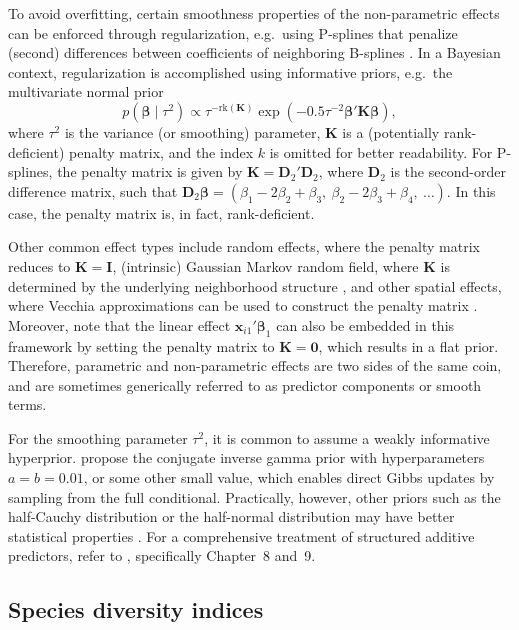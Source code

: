 \documentclass{article}
\newcommand{\Dmat}{\mathbf{D}}
\newcommand{\Imat}{\mathbf{I}}
\newcommand{\Kmat}{\mathbf{K}}
\newcommand{\Zeromat}{\mathbf{0}}
\newcommand{\xvec}{\bm{x}}
\newcommand{\betavec}{\bm{\beta}}
\newcommand{\rk}{\text{rk}}
\begin{document}
To avoid overfitting, certain smoothness properties of the non-parametric effects can be enforced through regularization, e.g.~using P-splines that penalize (second) differences between coefficients of neighboring B-splines \citep{eilersFlexible1996, langBayesian2004}. In a Bayesian context, regularization is accomplished using informative priors, e.g.~the multivariate normal prior
$$p(\betavec \mid \tau^2) \propto \tau^{-\rk(\Kmat)} \exp(-0.5 \tau^{-2} \betavec'\Kmat\betavec),$$
where $\tau^2$ is the variance (or smoothing) parameter, $\Kmat$ is a (potentially rank-deficient) penalty matrix, and the index $k$ is omitted for better readability. For P-splines, the penalty matrix is given by $\Kmat = \Dmat_2'\Dmat_2$, where $\Dmat_2$ is the second-order difference matrix, such that $\Dmat_2\betavec = (\beta_1 - 2\beta_2 + \beta_3,~\beta_2 - 2\beta_3 + \beta_4,~\dots)$. In this case, the penalty matrix is, in fact, rank-deficient.

Other common effect types include random effects, where the penalty matrix reduces to $\Kmat = \Imat$, (intrinsic) Gaussian Markov random field, where $\Kmat$ is determined by the underlying neighborhood structure \citep{rueGaussian2005}, and other spatial effects, where Vecchia approximations can be used to construct the penalty matrix \citep{katzfussGeneral2021}. Moreover, note that the linear effect $\xvec_{i1}'\betavec_1$ can also be embedded in this framework by setting the penalty matrix to $\Kmat = \Zeromat$, which results in a flat prior. Therefore, parametric and non-parametric effects are two sides of the same coin, and are sometimes generically referred to as predictor components or smooth terms.

For the smoothing parameter $\tau^2$, it is common to assume a weakly informative hyperprior. \citet{langBayesian2004} propose the conjugate inverse gamma prior with hyperparameters $a = b = 0.01$, or some other small value, which enables direct Gibbs updates by sampling from the full conditional. Practically, however, other priors such as the half-Cauchy distribution or the half-normal distribution may have better statistical properties \citep{gelmanPrior2006, kleinScaleDependent2016}. For a comprehensive treatment of structured additive predictors, refer to \citet{fahrmeirRegression2013}, specifically Chapter~8 and~9.

\subsection{Species diversity indices}
\label{sec:diversity}
\end{document}
